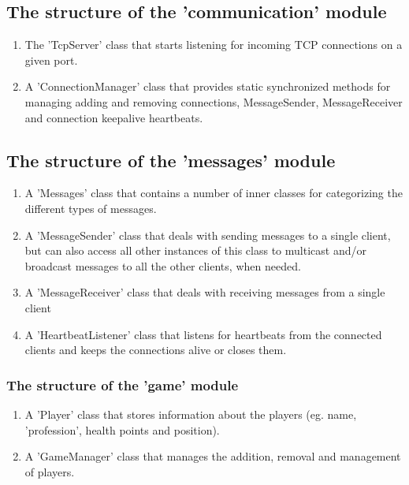 \documentclass{article}
\begin{document}
\subsection{The structure of the 'communication' module}

\begin{enumerate}
  
  \item The 'TcpServer' class that starts listening for incoming TCP connections
  on a given port. 
	
  \item A 'ConnectionManager' class that provides static synchronized methods
  for managing adding and removing connections, MessageSender, MessageReceiver
  and connection keepalive heartbeats.
  
\end{enumerate}

\subsection{The structure of the 'messages' module}

\begin{enumerate}
  
  \item A 'Messages' class that contains a number of inner classes for
  categorizing the different types of messages.
  
  \item A 'MessageSender' class that deals with sending messages to a single
  client, but can also access all other instances of this class to multicast
  and/or broadcast messages to all the other clients, when needed.
  
  \item A 'MessageReceiver' class that deals with receiving messages from a
  single client
  
  \item A 'HeartbeatListener' class that listens for heartbeats from the
  connected clients and keeps the connections alive or closes them.
  
\end{enumerate}

\subsubsection{The structure of the 'game' module}

\begin{enumerate}
  
  \item A 'Player' class that stores information about the players (eg. name,
  'profession', health points and position).
  
  \item A 'GameManager' class that manages the addition, removal and management
  of players.
  
\end{enumerate}
\end{document}
